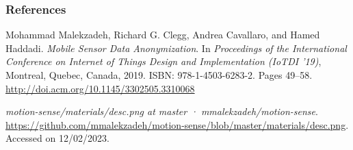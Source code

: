 \documentclass[
	11pt, %
]{beamer}
\begin{document}
\begin{frame}[allowframebreaks] %
	\frametitle{References}
	
    \begin{thebibliography}{9}
        \footnotesize %

        Mohammad Malekzadeh, Richard G. Clegg, Andrea Cavallaro, and Hamed Haddadi.
        \textit{Mobile Sensor Data Anonymization}.
        In \textit{Proceedings of the International Conference on Internet of Things Design and Implementation (IoTDI '19)}, 
        Montreal, Quebec, Canada, 2019. 
        ISBN: 978-1-4503-6283-2.
        Pages 49--58.
        \url{http://doi.acm.org/10.1145/3302505.3310068}
        
        \textit{motion-sense/materials/desc.png at master · mmalekzadeh/motion-sense}.
        \url{https://github.com/mmalekzadeh/motion-sense/blob/master/materials/desc.png}.
        Accessed on 12/02/2023.
        
    \end{thebibliography}
\end{frame}
\end{document}
